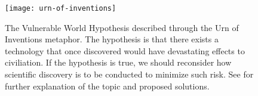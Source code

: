 \begin{figure}[h]
  \centering
  \texttt{[image: urn-of-inventions]}
    \caption[The Vulnerable World Hypothesis]{The Vulnerable World Hypothesis described through the Urn of Inventions metaphor. The hypothesis is that there exists a technology that once discovered would have devastating effects to civiliation. If the hypothesis is true, we should reconsider how scientific discovery is to be conducted to minimize such risk. See \citep{bostrom2019} for further explanation of the topic and proposed solutions.}
    \label{fig8:vwh}
\end{figure}
